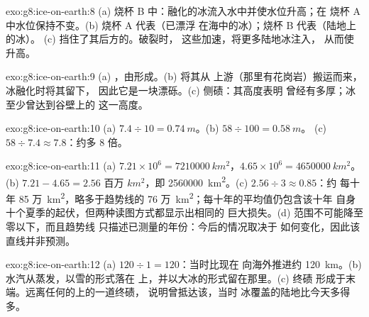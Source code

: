 \begin{solution}{exo:g8:ice-on-earth:8}
(a) 烧杯 B 中：融化的冰流入水中并使水位升高；在
烧杯 A 中水位保持不变。(b) 烧杯 A 代表（已漂浮
在海中的冰）；烧杯 B 代表（陆地上的冰）。
(c) 挡住了其后方的。破裂时，
这些加速，将更多陆地冰注入，
从而使升高。
\end{solution}

\begin{solution}{exo:g8:ice-on-earth:9}
(a) ，由形成。(b) 将其从
上游（那里有花岗岩）搬运而来，冰融化时将其留下，
因此它是一块漂砾。(c) 侧碛：其高度表明
曾经有多厚；冰至少曾达到谷壁上的
这一高度。
\end{solution}

\begin{solution}{exo:g8:ice-on-earth:10}
(a) $7.4 \div 10 = \qty{0.74}{m}$。(b) $58 \div 100 = \qty{0.58}{m}$。
(c) $58 \div 7.4 \approx 7.8$：约多 8 倍。
\end{solution}

\begin{solution}{exo:g8:ice-on-earth:11}
(a) $7.21 \times 10^6 = \qty{7210000}{km^2}$，$4.65 \times 10^6 =
\qty{4650000}{km^2}$。(b) $7.21 - 4.65 = \num{2.56}\text{ 百万 }\unit{km^2}$，即
\qty{2560000}{km^2}。(c) $2.56 \div 3 \approx 0.85$：约
每十年 85 万~\unit{km^2}，略多于趋势线的
76 万~\unit{km^2}；每十年的平均值仍包含该十年
自身十个夏季的起伏，但两种读图方式都显示出相同的
巨大损失。(d) 范围不可能降至零以下，而且趋势线
只描述已测量的年份：今后的情况取决于
如何变化，因此该直线并非预测。
\end{solution}

\begin{solution}{exo:g8:ice-on-earth:12}
(a) $120 \div 1 = 120$：当时比现在
向海外推进约 \qty{120}{km}。(b) 水汽从蒸发，以雪的形式落在
上，并以大冰的形式留在那里。(c) 终碛
形成于末端。远离任何的上的一道终碛，
说明曾抵达该，当时
冰覆盖的陆地比今天多得多。
\end{solution}

